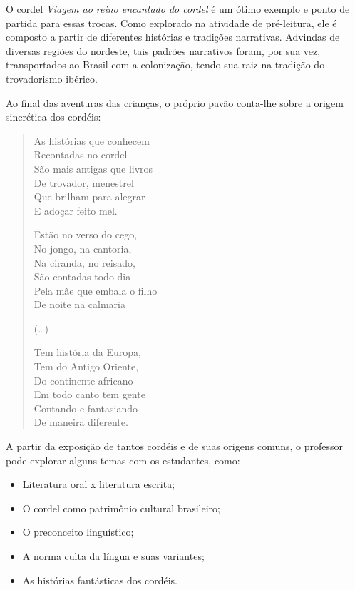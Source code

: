 \documentclass[11pt]{extarticle}
\begin{document}
O cordel \textit{Viagem ao reino encantado do cordel} é um ótimo exemplo e ponto de partida para essas trocas. Como explorado na atividade de pré-leitura, ele é composto a partir de diferentes histórias e tradições narrativas. Advindas de diversas regiões do nordeste, tais padrões narrativos foram, por sua vez, transportados ao Brasil com a colonização, tendo sua raiz na tradição do trovadorismo ibérico.

Ao final das aventuras das crianças, o próprio pavão conta-lhe sobre a origem sincrética dos cordéis:

\begin{verse}
As histórias que conhecem\\
Recontadas no cordel\\
São mais antigas que livros\\
De trovador, menestrel\\
Que brilham para alegrar\\
E adoçar feito mel.

Estão no verso do cego,\\
No jongo, na cantoria,\\
Na ciranda, no reisado,\\
São contadas todo dia\\
Pela mãe que embala o filho\\
De noite na calmaria

(\ldots)

Tem história da Europa,\\
Tem do Antigo Oriente,\\
Do continente africano —\\
Em todo canto tem gente\\
Contando e fantasiando\\
De maneira diferente.
\end{verse}

A partir da exposição de tantos cordéis e de suas origens comuns, o professor pode explorar alguns temas com os estudantes, como: 

\begin{itemize}
\item Literatura oral x literatura escrita;

\item O cordel como patrimônio cultural brasileiro;

\item O preconceito linguístico;

\item A norma culta da língua e suas variantes;

\item As histórias fantásticas dos cordéis.
\end{itemize}
\end{document}
